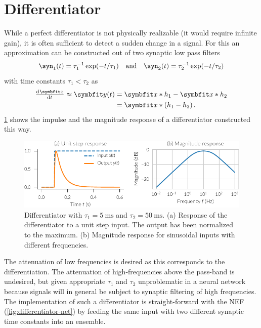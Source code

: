 \section{Differentiator}\label{sec:differentiator}
While a perfect differentiator is not physically realizable (it would require infinite gain), it is often sufficient to detect a sudden change in a signal.
For this an approximation can be constructed out of two synaptic low pass filters
\begin{equation*}
    \syn_1(t) =  \tau_1^{-1} \exp({-t}/\tau_1)\quad \text{and}\quad \syn_2(t) = \tau_2^{-1} \exp({-t}/\tau_2)
\end{equation*}
with time constants $\tau_1 < \tau_2$ as
\begin{equation}
    \begin{split}
        \od{\vc x}{t} \approx \vc y(t) &= \vc x * h_1 - \vc x * h_2 \\&= \vc x * \del{h_1 - h_2} \text{.}
    \end{split}
\end{equation}
\cref{fig:differentiator} shows the impulse and the magnitude response of a differentiator constructed this way.
\begin{figure}
    \centering
    \includegraphics{figures/differentiator}
    \caption[Differentiator.]{Differentiator with $\tau_1 = \SI{5}{\milli\second}$ and $\tau_2 = \SI{50}{\milli\second}$. (a) Response of the differentiator to a unit step input. The output has been normalized to the maximum. (b) Magnitude response for sinusoidal inputs with different frequencies.}\label{fig:differentiator}
\end{figure}
The attenuation of low frequencies is desired as this corresponds to the differentiation.
The attenuation of high-frequencies above the pass-band is undesired, but given appropriate $\tau_1$ and $\tau_2$ unproblematic in a neural network because signals will in general be subject to synaptic filtering of high frequencies. The implementation of such a differentiator is straight-forward with the NEF (\cref{fig:differentiator-net}) by feeding the same input with two different synaptic time constants into an ensemble.
